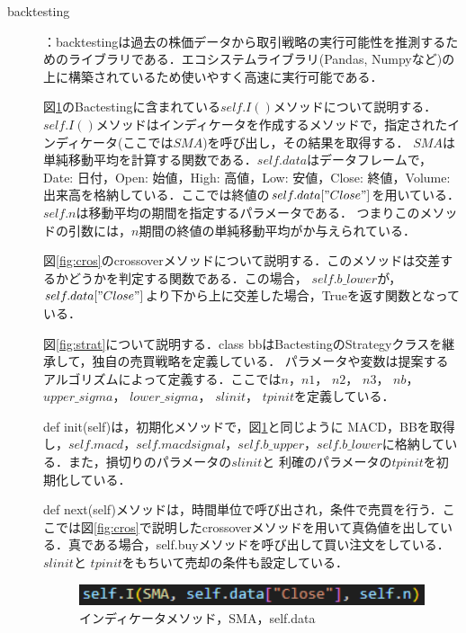 \begin{description}
  \item [backtesting\cite{backtesting}]：backtestingは過去の株価データから取引戦略の実行可能性を推測するためのライブラリである．エコシステムライブラリ(Pandas, Numpyなど)の上に構築されているため使いやすく高速に実行可能である．
 
 図\ref{fig:ISMA}のBactestingに含まれている$self.I()$メソッドについて説明する．
 $self.I()$メソッドはインディケータを作成するメソッドで，指定されたインディケータ(ここでは$SMA$)を呼び出し，その結果を取得する．
 $SMA$は単純移動平均を計算する関数である．$self.data$はデータフレームで，
 Date: 日付，Open: 始値，High: 高値，Low: 安値，Close: 終値，Volume: 出来高を格納している．ここでは終値の$self.data["Close"]$を用いている．
 $self.n$は移動平均の期間を指定するパラメータである．
 つまりこのメソッドの引数には，$n$期間の終値の単純移動平均がか与えられている．
  
   図\ref{fig:cros}のcrossoverメソッドについて説明する．このメソッドは交差するかどうかを判定する関数である．この場合，
   \( self.b\_lower \)が，$self.data["Close"]$より下から上に交差した場合，Trueを返す関数となっている．
   

   図\ref{fig:strat}について説明する．class bbはBactestingのStrategyクラスを継承して，独自の売買戦略を定義している．
   パラメータや変数は提案するアルゴリズムによって定義する．ここでは\( n \)，\( n1 \)， \( n2 \)， \( n3 \)， \( nb \)， \( upper\_sigma \)， \( lower\_sigma \)， \( slinit \)， \( tpinit \)を定義している．
   
   def init(self)は，初期化メソッドで，図\ref{fig:ISMA}と同じように
   MACD，BBを取得し，\(self.macd\)，\(self.macdsignal\)，\(self.b\_upper\)，\(self.b\_lower\)に格納している．また，損切りのパラメータの\( slinit \)と 利確のパラメータの\( tpinit \)を初期化している．

   def next(self)メソッドは，時間単位で呼び出され，条件で売買を行う．ここでは図\ref{fig:cros}で説明したcrossoverメソッドを用いて真偽値を出している．真である場合，self.buyメソッドを呼び出して買い注文をしている．
   \( slinit \)と \( tpinit \)をもちいて売却の条件も設定している．
   \begin{figure}[H]
    \centering
    \includegraphics[width=110mm]{fig/I_SMA.png}
    \caption{インディケータメソッド，SMA，self.data}
    \label{fig:ISMA}
   \end{figure}


\end{description}
